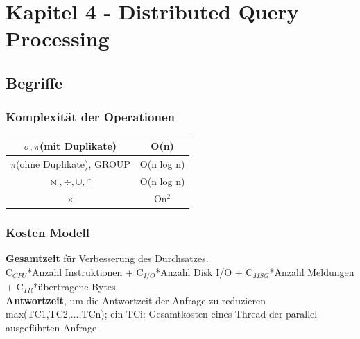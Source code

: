 \documentclass[a4paper,11pt]{article}
\begin{document}
\section{Kapitel 4 - Distributed Query Processing}
\subsection{Begriffe}
\subsubsection{Komplexität der Operationen}
\begin{tabular}{|c|c|}
\hline
$\sigma,\pi$(mit Duplikate) & O(n)\\ \hline
$\pi$(ohne Duplikate), GROUP & O(n log n)\\ \hline
$\bowtie,\div,\cup,\cap$ & O(n log n)\\ \hline
$\times$ & On$^{2}$\\ \hline
\end{tabular}
\subsubsection{Kosten Modell}
\textbf{Gesamtzeit} für Verbesserung des Durchsatzes.\\
C$_{CPU}$*Anzahl Instruktionen + C$_{I/O}$*Anzahl Disk I/O + C$_{MSG}$*Anzahl Meldungen + C$_{TR}$*übertragene Bytes\\
\textbf{Antwortzeit}, um die Antwortzeit der Anfrage zu reduzieren\\
max(TC1,TC2,...,TCn); ein TCi: Gesamtkosten eines Thread der parallel ausgeführten Anfrage
\end{document}
